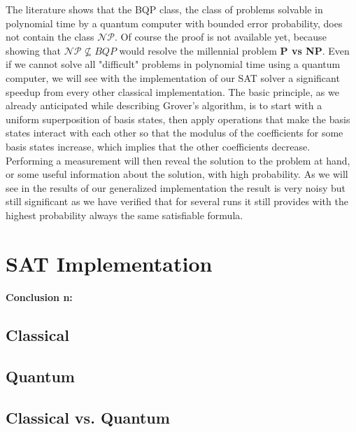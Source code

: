 \documentclass[english]{article}
\begin{document}
			The literature shows that the BQP class, the class of problems solvable in polynomial time by a quantum computer with bounded error probability, does not contain the class $\mathcal{N}\mathcal{P}$. Of course the proof is not available yet, because showing that $\mathcal{N}\mathcal{P}\nsubseteq BQP$ would resolve the millennial problem \textbf{P vs NP}. Even if we cannot solve all "difficult" problems in polynomial time using a quantum computer, we will see with the implementation of our SAT solver a significant speedup from every other classical implementation. The basic principle, as we already anticipated while describing Grover's algorithm, is to start with a uniform superposition of basis states, then apply operations that make the basis states interact with each other so that the modulus of the coefficients for some basis states increase, which implies that the other coefficients decrease. Performing a measurement will then reveal the solution to the problem at hand, or some useful information about the solution, with high probability. As we will see in the results of our generalized implementation the result is very noisy but still significant as we have verified that for several runs it still provides with the highest probability always the same satisfiable formula.
		
	\section{SAT Implementation}
	\label{sec:satImpl}
	
		\paragraph{Conclusion n:} \label{conc:queryCompl}
		
		\subsection{Classical}
		\label{sec:satClassical}
		
		\subsection{Quantum}
		\label{sec:satQuantum}
		
		\subsection{Classical vs. Quantum}
		\label{sec:satCsatQ}
		
\end{document}
